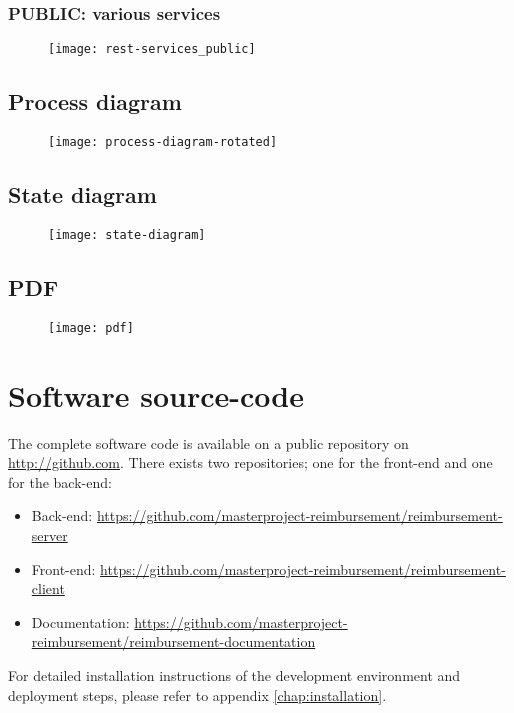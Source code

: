 \subsection{PUBLIC: various services}
\begin{figure}[H]
    {\texttt{[image: rest-services\_public]}}
\end{figure}
\newpage

\section{Process diagram}
\label{sec:process-diagram-rotated}

\begin{figure}[H]
    {\texttt{[image: process-diagram-rotated]}}
\end{figure}

\section{State diagram}
\label{sec:state-diagram}

\begin{figure}[H]
    {\texttt{[image: state-diagram]}}
\end{figure}

\section{PDF}
\label{sec:app-pdf}

\begin{figure}[H]
    {\texttt{[image: pdf]}}
\end{figure}

\chapter{Software source-code}
\label{github-source}

The complete software code is available on a public repository on \url{http://github.com}. There exists two repositories; one for the front-end and one for the back-end:

\begin{itemize}
    \item Back-end: \newline \url{https://github.com/masterproject-reimbursement/reimbursement-server}
    \item Front-end: \newline \url{https://github.com/masterproject-reimbursement/reimbursement-client}
    \item Documentation: \newline \url{https://github.com/masterproject-reimbursement/reimbursement-documentation}
\end{itemize}

For detailed installation instructions of the development environment and deployment steps, please refer to appendix \ref{chap:installation}.
